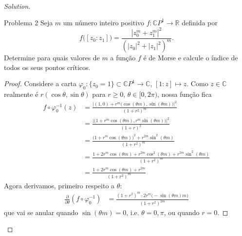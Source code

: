 \begin{proof}[Solution]
\iffalse
\begin{align*}
\frac{\partial }{\partial x_i}(f \circ \varphi_r^{-1})(z)&=\frac{\left(1+\sum_{j \neq r}(x_j^2+y_j^2)\right)\cdot 2ix_i-2x_i\left(r+\sum_{j \neq r}j(x_j^2+y_j^2)\right) }{\left(1+\sum_{j \neq  r}(x_j^2+y_j^2)\right)^2}\\
&=2x_i \frac{\left(\sum_{j\neq r}(x_j^2+y_j^2)\right) (i-1)+i-r}{\left(1+\sum_{j \neq r}(x_j^2+y_j^2)\right)^2}
\end{align*}
que se anula quando \(x_i=0\) para toda \(i\), e o mesmo sucede para as coordenadas imaginárias \(y_i\). Denote \(A:=\sum_{j \neq r}(x_j^2+y_j^2)\). Derivando de novo obtemos
\begin{align*}
	\frac{\partial^2 }{\partial x_i\partial x_j}&=\frac{(1+A)^2\cdot 2x_j(i-1)-2(1+A)\cdot 2x_j \left(A(i-1)+i-r\right)}{(1+A)^4}
\end{align*}\fi
\begin{thing1}{Problema 2}\label{prob: 2}\leavevmode
Seja \(m\) um número inteiro positivo \(f:\mathbb{C}P^{1}\to \mathbb{R}\) definida por
\[f\Big([z_0:z_1]\Big)=\frac{|z_0^m+z_1^m|^2}{(|z_0|^2+|z_1|^2)^m}.\]
Determine para quais valores de \(m\) a função \(f\) é de Morse e calcule o índice de todos os seus pontos críticos.
\end{thing1}

\begin{proof}\leavevmode
Considere a carta \(\varphi_0:\{z_0=1\}\subset\mathbb{C}P^{1}\to \mathbb{C}\), \([1:z]\mapsto z\). Como \(z \in \mathbb{C}\) realmente é \(r(\cos \theta, \sin  \theta)\) para \(r\geq 0\), \(\theta \in [0, 2\pi)\), nossa função fica
\begin{align*}
f\circ \varphi_0^{-1}(z)&=\frac{ \Big|(1,0)+r^m\Big(\cos (\theta m), \sin (\theta m)\Big)\Big|^2}{(1+r^2)^m}\\
&=\frac{\Big|\Big(1+r^m\cos (\theta m),r^m \sin (\theta m)\Big)\Big|^2}{(1+r)^2}\\
&=\frac{\Big(1+r^m \cos (\theta m) \Big)^2+ r^{2m} \sin^2(\theta m)}{(1+r^2)^m}\\
&=\frac{1+2 r^m \cos (\theta m)+r^{2m} \cos^2(\theta m)+r^{2m} \sin^2 (\theta m)}{(1+r^2)^m}\\
&=\frac{1+2r^m \cos (\theta m)+r^{2m}}{(1+r^2)^m}
\end{align*}
Agora derivamos, primeiro respeito a \(\theta\):
\begin{align*}
\frac{\partial }{\partial \theta}(f \circ \varphi_0^{-1})&= \frac{(1+r^2)^m\cdot  2r^m \Big(-\sin(\theta m)m\Big)}{(1+r^2)^{2m}}
\end{align*}
que vai se anular quando \(\sin  (\theta m)=0\), i.e. \(\theta =0,\pi\), ou quando \(r=0\).


\end{proof}
\end{proof}
